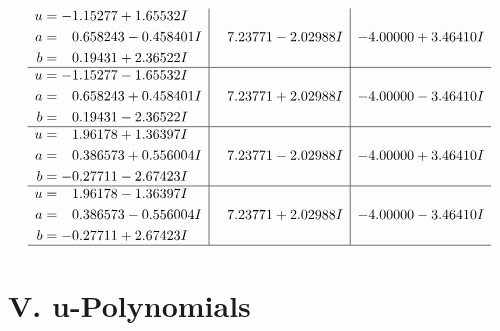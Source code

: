 \documentclass[1p]{elsarticle_modified}
\theoremstyle{definition}
\begin{document}
$$\begin{array}{c|c|c}
\begin{aligned}
u &= -1.15277 + 1.65532 I \\
a &= \phantom{-}0.658243 - 0.458401 I \\
b &= \phantom{-}0.19431 + 2.36522 I\end{aligned}
 & \phantom{-}7.23771 - 2.02988 I & -4.00000 + 3.46410 I \\ \hline\begin{aligned}
u &= -1.15277 - 1.65532 I \\
a &= \phantom{-}0.658243 + 0.458401 I \\
b &= \phantom{-}0.19431 - 2.36522 I\end{aligned}
 & \phantom{-}7.23771 + 2.02988 I & -4.00000 - 3.46410 I \\ \hline\begin{aligned}
u &= \phantom{-}1.96178 + 1.36397 I \\
a &= \phantom{-}0.386573 + 0.556004 I \\
b &= -0.27711 - 2.67423 I\end{aligned}
 & \phantom{-}7.23771 - 2.02988 I & -4.00000 + 3.46410 I \\ \hline\begin{aligned}
u &= \phantom{-}1.96178 - 1.36397 I \\
a &= \phantom{-}0.386573 - 0.556004 I \\
b &= -0.27711 + 2.67423 I\end{aligned}
 & \phantom{-}7.23771 + 2.02988 I & -4.00000 - 3.46410 I\\
 \hline 
 \end{array}$$\newpage
\newpage\renewcommand{\arraystretch}{1}
\centering \section*{ V. u-Polynomials}
\end{document}
